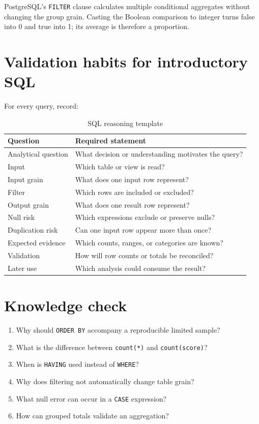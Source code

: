PostgreSQL's \texttt{FILTER} clause calculates multiple conditional aggregates
without changing the group grain. Casting the Boolean comparison to integer
turns false into 0 and true into 1; its average is therefore a proportion.

\section{Validation habits for introductory SQL}

For every query, record:

\begin{table}[htbp]
\centering
\caption{SQL reasoning template}
\label{tab:sql-template}
\begin{tabularx}{\textwidth}{L{0.27\textwidth}Y}
\toprule
Question & Required statement \\
\midrule
Analytical question & What decision or understanding motivates the query? \\
Input & Which table or view is read? \\
Input grain & What does one input row represent? \\
Filter & Which rows are included or excluded? \\
Output grain & What does one result row represent? \\
Null risk & Which expressions exclude or preserve nulls? \\
Duplication risk & Can one input row appear more than once? \\
Expected evidence & Which counts, ranges, or categories are known? \\
Validation & How will row counts or totals be reconciled? \\
Later use & Which analysis could consume the result? \\
\bottomrule
\end{tabularx}
\end{table}

\section{Knowledge check}

\begin{enumerate}
  \item Why should \texttt{ORDER BY} accompany a reproducible limited sample?
  \item What is the difference between \texttt{count(*)} and
    \texttt{count(score)}?
  \item When is \texttt{HAVING} used instead of \texttt{WHERE}?
  \item Why does filtering not automatically change table grain?
  \item What null error can occur in a \texttt{CASE} expression?
  \item How can grouped totals validate an aggregation?
\end{enumerate}

